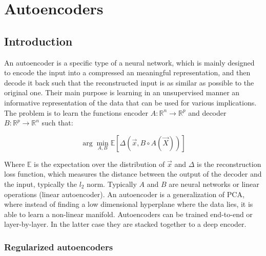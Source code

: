 \chapter{Autoencoders}

\section{Introduction}
An autoencoder is a specific type of a neural network, which is mainly designed to encode the input into a compressed an meaningful representation, and then decode it back such that the reconstructed input is as similar as possible to the original one.
Their main purpose is learning in an unsupervised manner an informative representation of the data that can be used for various implications.
The problem is to learn the functions encoder $A:\mathbb{R}^n\rightarrow\mathbb{R}^p$ and decoder $B:\mathbb{R}^p\rightarrow \mathbb{R}^n$ such that:

$$\arg\min\limits_{A, B}\mathbb{E}[\Delta(\vec{x}, B\circ A(\vec{X}))]$$

Where $\mathbb{E}$ is the expectation over the distribution of $\vec{x}$ and $\Delta$ is the reconstruction loss function, which measures the distance between the output of the decoder and the input, typically the $l_2$ norm.
Typically $A$ and $B$ are neural networks or linear operations (linear autoencoder).
An autoencoder is a generalization of PCA, where instead of finding a low dimensional hyperplane where the data lies, it is able to learn a non-linear manifold.
Autoencoders can be trained end-to-end or layer-by-layer.
In the latter case they are stacked together to a deep encoder.

	\subsection{Regularized autoencoders}

